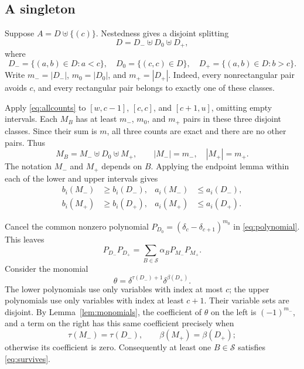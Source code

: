 \documentclass[11pt]{amsart}
\newcommand{\tops}{\tau}
\newcommand{\bots}{\beta}
\newcommand{\un}{\uplus}
\begin{document}
\subsection{A singleton}

Suppose $A=D\un\{(c)\}$. Nestedness gives a disjoint splitting
\[
 D=D_-\un D_0\un D_+,
\]
where
\[
 D_-=\{(a,b)\in D:a<c\},\quad
 D_0=\{(c,c)\in D\},\quad
 D_+=\{(a,b)\in D:b>c\}.
\]
Write $m_-=|D_-|$, $m_0=|D_0|$, and $m_+=|D_+|$.
Indeed, every nonrectangular pair avoids $c$, and every rectangular
pair belongs to exactly one of these classes.

Apply \eqref{eq:allcounts} to $[w,c-1]$, $[c,c]$, and $[c+1,u]$,
omitting empty intervals. Each $M_B$ has at least $m_-$, $m_0$,
and $m_+$ pairs in these three disjoint classes. Since their sum is
$m$, all three counts are exact and there are no other pairs. Thus
\begin{equation}\label{eq:split}
 M_B=M_-\un D_0\un M_+,
 \qquad |M_-|=m_-,\quad |M_+|=m_+.
\end{equation}
The notation $M_-$ and $M_+$ depends on $B$.
Applying the endpoint lemma within each of the lower and upper
intervals gives
\begin{equation}\label{eq:blockendpoints}
 \begin{aligned}
 b_i(M_-)&\ge b_i(D_-),& a_i(M_-)&\le a_i(D_-),\\
 b_i(M_+)&\ge b_i(D_+),& a_i(M_+)&\le a_i(D_+).
 \end{aligned}
\end{equation}

Cancel the common nonzero polynomial
$P_{D_0}=(\delta_c-\delta_{c+1})^{m_0}$ in
\eqref{eq:polynomial}. This leaves
\begin{equation}\label{eq:splitidentity}
 P_{D_-}P_{D_+}=\sum_{B\in\mathcal S}\alpha_BP_{M_-}P_{M_+}.
\end{equation}
Consider the monomial
\begin{equation}\label{eq:mixed}
 \theta=\delta^{\tops(D_-)+1}\delta^{\bots(D_+)}.
\end{equation}
The lower polynomials use only variables with index at most $c$;
the upper polynomials use only variables with index at least $c+1$.
Their variable sets are disjoint. By Lemma~\ref{lem:monomials}, the
coefficient of $\theta$ on the left is $(-1)^{m_-}$, and a term on the
right has this same coefficient precisely when
\begin{equation}\label{eq:survives}
 \tops(M_-)=\tops(D_-),\qquad \bots(M_+)=\bots(D_+);
\end{equation}
otherwise its coefficient is zero. Consequently at least one
$B\in\mathcal S$ satisfies \eqref{eq:survives}.
\end{document}

